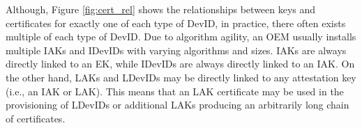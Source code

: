 \vspace{2em}
Although, Figure \ref{fig:cert_rel} shows the relationships between keys and certificates for exactly one of each type of DevID, in practice, there often exists multiple of each type of DevID. Due to algorithm agility, an OEM usually installs multiple IAKs and IDevIDs with varying algorithms and sizes. IAKs are always directly linked to an EK, while IDevIDs are always directly linked to an IAK. On the other hand, LAKs and LDevIDs may be directly linked to any attestation key (i.e., an IAK or LAK). This means that an LAK certificate may be used in the provisioning of LDevIDs or additional LAKs producing an arbitrarily long chain of certificates. 

